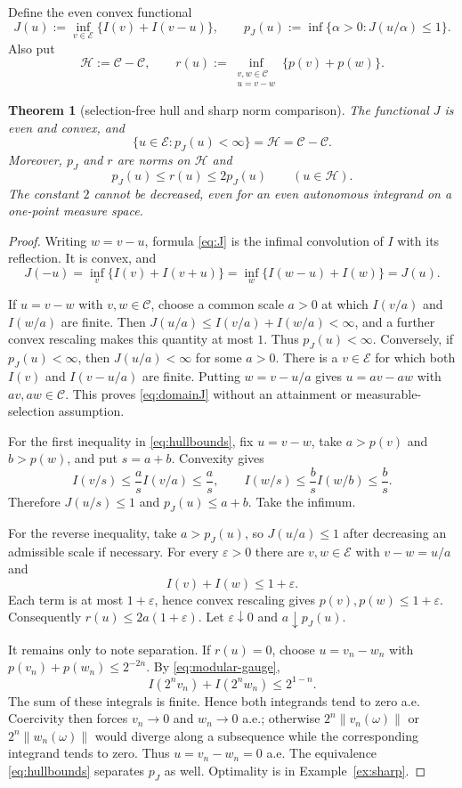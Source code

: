 \documentclass[11pt]{article}
\newtheorem{theorem}{Theorem}
\theoremstyle{definition}
\newcommand{\cC}{\mathcal C}
\newcommand{\cE}{\mathcal E}
\newcommand{\cH}{\mathcal H}
\newcommand{\pJ}{p_J}
\newcommand{\eps}{\varepsilon}
\begin{document}
Define the even convex functional
\[
 J(u):=\inf_{v\in\cE}\{I(v)+I(v-u)\},
\qquad
 \pJ(u):=\inf\{\alpha>0:J(u/\alpha)\le1\}.
\tag{5.1}\label{eq:J}
\]
Also put
\[
 \cH:=\cC-\cC,\qquad
 r(u):=\inf_{\substack{v,w\in\cC\\u=v-w}}\{p(v)+p(w)\}.
\tag{5.2}\label{eq:r}
\]

\begin{theorem}[selection-free hull and sharp norm comparison]
\label{thm:hull}
The functional $J$ is even and convex, and
\[
 \{u\in\cE:\pJ(u)<\infty\}=\cH=\cC-\cC.
\tag{5.3}\label{eq:domainJ}
\]
Moreover, $p_J$ and $r$ are norms on $\cH$ and
\[
 \pJ(u)\le r(u)\le2\pJ(u)\qquad(u\in\cH).
\tag{5.4}\label{eq:hullbounds}
\]
The constant $2$ cannot be decreased, even for an even autonomous integrand
on a one-point measure space.
\end{theorem}

\begin{proof}
Writing $w=v-u$, formula \eqref{eq:J} is the infimal convolution of $I$
with its reflection.  It is convex, and
\[
 J(-u)=\inf_v\{I(v)+I(v+u)\}
      =\inf_w\{I(w-u)+I(w)\}=J(u).
\]

If $u=v-w$ with $v,w\in\cC$, choose a common scale $a>0$ at which
$I(v/a)$ and $I(w/a)$ are finite.  Then
$J(u/a)\le I(v/a)+I(w/a)<\infty$, and a further convex rescaling makes this
quantity at most $1$.  Thus $\pJ(u)<\infty$.
Conversely, if $\pJ(u)<\infty$, then $J(u/a)<\infty$ for some $a>0$.
There is a $v\in\cE$ for which both $I(v)$ and $I(v-u/a)$ are finite.
Putting $w=v-u/a$ gives $u=av-aw$ with $av,aw\in\cC$.  This proves
\eqref{eq:domainJ} without an attainment or measurable-selection assumption.

For the first inequality in \eqref{eq:hullbounds}, fix
$u=v-w$, take $a>p(v)$ and $b>p(w)$, and put $s=a+b$.  Convexity gives
\[
 I(v/s)\le\frac{a}{s}I(v/a)\le\frac{a}{s},\qquad
 I(w/s)\le\frac{b}{s}I(w/b)\le\frac{b}{s}.
\]
Therefore $J(u/s)\le1$ and $\pJ(u)\le a+b$.  Take the infimum.

For the reverse inequality, take $a>\pJ(u)$, so $J(u/a)\le1$ after
decreasing an admissible scale if necessary.  For every $\eps>0$ there are
$v,w\in\cE$ with $v-w=u/a$ and
\[
 I(v)+I(w)\le1+\eps.
\]
Each term is at most $1+\eps$, hence convex rescaling gives
$p(v),p(w)\le1+\eps$.  Consequently
$r(u)\le2a(1+\eps)$.  Let $\eps\downarrow0$ and $a\downarrow\pJ(u)$.

It remains only to note separation.  If $r(u)=0$, choose
$u=v_n-w_n$ with
$p(v_n)+p(w_n)\le2^{-2n}$.  By \eqref{eq:modular-gauge},
\[
 I(2^n v_n)+I(2^n w_n)\le2^{1-n}.
\]
The sum of these integrals is finite.  Hence both integrands tend to zero
a.e.  Coercivity then forces $v_n\to0$ and $w_n\to0$ a.e.; otherwise
$2^n\|v_n(\omega)\|$ or $2^n\|w_n(\omega)\|$ would diverge along a
subsequence while the corresponding integrand tends to zero.  Thus
$u=v_n-w_n=0$ a.e.  The equivalence \eqref{eq:hullbounds} separates $p_J$
as well.  Optimality is in Example~\ref{ex:sharp}.
\end{proof}
\end{document}
